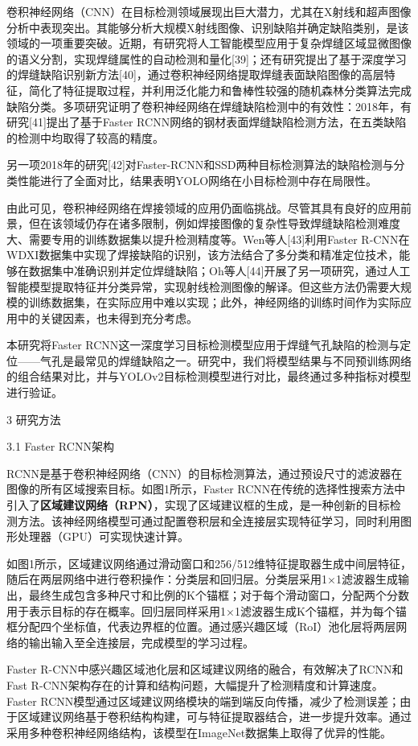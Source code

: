 卷积神经网络（CNN）在目标检测领域展现出巨大潜力，尤其在X射线和超声图像分析中表现突出。其能够分析大规模X射线图像、识别缺陷并确定缺陷类别，是该领域的一项重要突破。近期，有研究将人工智能模型应用于复杂焊缝区域显微图像的语义分割，实现焊缝属性的自动检测和量化{[}39{]}；还有研究提出了基于深度学习的焊缝缺陷识别新方法{[}40{]}，通过卷积神经网络提取焊缝表面缺陷图像的高层特征，简化了特征提取过程，并利用泛化能力和鲁棒性较强的随机森林分类算法完成缺陷分类。多项研究证明了卷积神经网络在焊缝缺陷检测中的有效性：2018年，有研究{[}41{]}提出了基于Faster
RCNN网络的钢材表面焊缝缺陷检测方法，在五类缺陷的检测中均取得了较高的精度。

另一项2018年的研究{[}42{]}对Faster-RCNN和SSD两种目标检测算法的缺陷检测与分类性能进行了全面对比，结果表明YOLO网络在小目标检测中存在局限性。

由此可见，卷积神经网络在焊接领域的应用仍面临挑战。尽管其具有良好的应用前景，但在该领域仍存在诸多限制，例如焊接图像的复杂性导致焊缝缺陷检测难度大、需要专用的训练数据集以提升检测精度等。Wen等人{[}43{]}利用Faster
R-CNN在WDXI数据集中实现了焊接缺陷的识别，该方法结合了多分类和精准定位技术，能够在数据集中准确识别并定位焊缝缺陷；Oh等人{[}44{]}开展了另一项研究，通过人工智能模型提取特征并分类异常，实现射线检测图像的解译。但这些方法仍需要大规模的训练数据集，在实际应用中难以实现；此外，神经网络的训练时间作为实际应用中的关键因素，也未得到充分考虑。

本研究将Faster
RCNN这一深度学习目标检测模型应用于焊缝气孔缺陷的检测与定位------气孔是最常见的焊缝缺陷之一。研究中，我们将模型结果与不同预训练网络的组合结果对比，并与YOLOv2目标检测模型进行对比，最终通过多种指标对模型进行验证。

3 研究方法

3.1 Faster RCNN架构

RCNN是基于卷积神经网络（CNN）的目标检测算法，通过预设尺寸的滤波器在图像的所有区域搜索目标。如图1所示，Faster
RCNN在传统的选择性搜索方法中引入了\textbf{区域建议网络（RPN）}，实现了区域建议框的生成，是一种创新的目标检测方法。该神经网络模型可通过配置卷积层和全连接层实现特征学习，同时利用图形处理器（GPU）可实现快速计算。

如图1所示，区域建议网络通过滑动窗口和256/512维特征提取器生成中间层特征，随后在两层网络中进行卷积操作：分类层和回归层。分类层采用1×1滤波器生成输出，最终生成包含多种尺寸和比例的K个锚框；对于每个滑动窗口，分配两个分数用于表示目标的存在概率。回归层同样采用1×1滤波器生成K个锚框，并为每个锚框分配四个坐标值，代表边界框的位置。通过感兴趣区域（RoI）池化层将两层网络的输出输入至全连接层，完成模型的学习过程。

Faster R-CNN中感兴趣区域池化层和区域建议网络的融合，有效解决了RCNN和Fast
R-CNN架构存在的计算和结构问题，大幅提升了检测精度和计算速度。Faster
RCNN模型通过区域建议网络模块的端到端反向传播，减少了检测误差；由于区域建议网络基于卷积结构构建，可与特征提取器结合，进一步提升效率。通过采用多种卷积神经网络结构，该模型在ImageNet数据集上取得了优异的性能。

